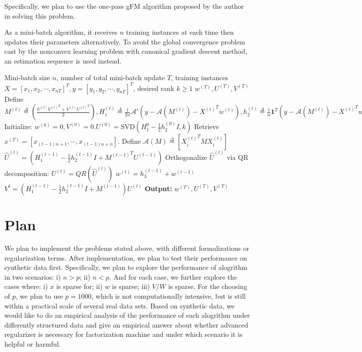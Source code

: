 \documentclass{article}
\begin{document}
 
Specifically, we plan to use the one-pass gFM algorithm proposed by the author in solving this problem.
 
 
As a mini-batch algorithm, it receives $n$ training instances at each time then updates their parameters alternatively. To avoid the global convergence problem cast by the nonconvex learning problem with canonical gradient descent method, an estimation sequence is used instead.
 
 
\begin{algorithm}
 \caption{One pass algorithm solving \cref{eq:one_pass_gfm}}
 \label{algo:alm}
 \begin{algorithmic}[1]
 \REQUIRE Mini-batch size $n$, number of total mini-batch update $T$, training instances $X=[x_1, x_2,\cdots, x_{nT}]^T, y=[y_1, y_2, \cdots, y_{nT}]^T$, desired rank $k \geq 1$
 \ENSURE $\mathit{w}^{(T)}, \mathit{U}^{(T)}, \mathit{V}^{(T)}$
 \STATE Define $M^{(t)}\overset{\Delta}{=}\left( \frac{U^{(t)}{V^{(t)}}^T+V^{(t)}{U^{(t)}}^T}{2}\right),
H_1^{(t)}\overset{\Delta}{=}\frac{1}{2n}\mathcal{A}'\left(y-\mathcal{A}(M^{(t)})-{X^{(t)}}^Tw^{(t)}\right),
h_2^{(t)}\overset{\Delta}{=}\frac{1}{n}\mathbf{1}^T\left(y-\mathcal{A}(M^{(t)})-{X^{(t)}}^Tw^{(t)}\right),
h_3^{(t)}\overset{\Delta}{=}\frac{1}{n}X^{(t)}\left(y-\mathcal{A}(M^{(t)})-{X^{(t)}}^Tw^{(t)}\right)$
 \STATE Initialize: $\mathit{w}^{(0)}=0, \mathit{V}^{(0)}=0. \mathit{U}^{(0)}=\mathrm{SVD}\left(H_1^{0}-\frac{1}{2}h_2^{(0)}I,k\right)$
     \STATE Retrieve $x^{(T)}=[x_{(t-1)n+1},\cdots,x_{(t-1)n+n}]$. Define $\mathcal{A}(M) \overset{\Delta}{=} \left[{X_i^{(t)}}^TMX_i^{(t)}\right]$
     \STATE $\hat{U}^{(t)}=\left(H_1^{(t-1)}-\frac{1}{2}h_2^{(t-1)}I+{M^{(t-1)}}^TU^{(t-1)}\right)$
     \STATE Orthogonalize $\hat{U}^{(t)}$ via QR decomposition: $U^{(t)}=QR(\hat{U}^{(t)})$  
     \STATE $\mathit{w}^{(t)}=\mathit{h}_3^{(t-1)}+\mathit{w}^{(t-1)}$
     \STATE $\mathit{V}^{t}=(\mathit{H}_1^{(t-1)}-\frac{1}{2}h_2^{(t-1)}I+\mathit{M}^{(t-1)})\mathit{U}^{(t)}$
    \ENDFOR
\STATE \textbf{Output:} $\mathit{w}^{(T)},\mathit{U}^{(T)},\mathit{V}^{(T)}$
 \end{algorithmic}
\end{algorithm}

\section{Plan}
 
We plan to implement the problems stated above, with different formalizations or regularization terms. After implementation, we plan to test their performance on synthetic data first. Specifically, we plan to explore the performance of alogrithm in two scenarios: i) $n > p$; ii) $n < p$. And for each case, we further explore the cases where: i) $x$ is sparse for; ii) $w$ is sparse; iii) $V/W$ is sparse. For the choosing of $p$, we plan to use $p = 1000$, which is not computationally intensive, but is still within a practical scale of several real data sets. Based on synthetic data, we would like to do an empirical analysis of the performance of each alogrithm under differently structured data and give an empirical answer about whether advanced regularizer is necessary for factorization machine and under which scenario it is helpful or harmful.
\end{document}
